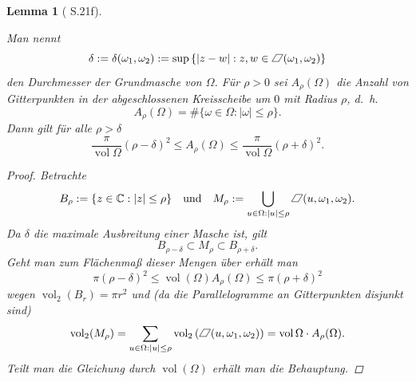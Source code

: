 \documentclass[12pt]{article}
\newtheorem{lemma}[theorem]{Lemma}
\numberwithin{equation}{section}
\newcommand{\kk}{\cite{kk} }
\newcommand{\vol}{\operatorname{vol}}
\newcommand*{\pa}{%
    \rlap{\rotatebox{-30}{\rule[.05ex]{.4pt}{.77em}}}%
    \kern.04em%
    \rlap{\kern.36em\raisebox{0.649519052835em}{\rule{.6em}{.4pt}}}%
    \rule{.6em}{.4pt}\kern-.04em%
    \rotatebox{-30}{\rule[.05ex]{.4pt}{.77em}}}
\begin{document}
\begin{lemma}[\kk S.21f]\label{lem-gitter-invariant}

Man nennt \begin{equation}{
\delta := \delta (\omega _1, \omega _2) := \sup \left\{ |z-w| : z, w \in \pa(\omega _1, \omega _2)  \right\}
}\end{equation} den Durchmesser der Grundmasche von \(\Omega\). Für
\(\rho > 0\) sei \(A_\rho(\Omega)\) die Anzahl von Gitterpunkten in der
abgeschlossenen Kreisscheibe um \(0\) mit Radius \(\rho\), d.~h.
\begin{equation}{
A_\rho(\Omega) = \# \{ \omega  \in \Omega : |\omega | \le \rho \} .
}\end{equation} Dann gilt für alle \(\rho > \delta\) \begin{equation}{
\frac{\pi }{\vol \Omega} (\rho - \delta )^2 \le A_\rho(\Omega) \le \frac{\pi }{\vol \Omega} (\rho + \delta )^2 .
}\end{equation}

\begin{proof}

Betrachte \begin{equation}{
B_\rho := \{ z \in \mathbb C : |z| \le \rho \} \quad \mathrm{und} \quad M_\rho := \bigcup_{u \in \Omega : |u| \le \rho} \pa(u, \omega _1,\omega _2).
}\end{equation} Da \(\delta\) die maximale Ausbreitung einer Masche ist,
gilt \begin{equation}{
B_{\rho - \delta } \subset M_\rho \subset B_{\rho + \delta }.
}\end{equation} Geht man zum Flächenmaß dieser Mengen über erhält man
\begin{equation}{
\pi (\rho - \delta )^2 \le \vol (\Omega) A_\rho(\Omega) \le \pi (\rho + \delta )^2
}\end{equation} wegen \(\vol_2 (B_r) = \pi r^2\) und (da die
Parallelogramme an Gitterpunkten disjunkt sind) \begin{equation}{
\vol_2(M_\rho) = \sum_{u \in \Omega : |u| \le \rho} \vol_2 \left( \pa(u, \omega _1, \omega _2) \right) = \vol \Omega \cdot A_\rho(\Omega).
}\end{equation} Teilt man die Gleichung durch \(\vol(\Omega)\) erhält
man die Behauptung.

\end{proof}

\end{lemma}
\end{document}
